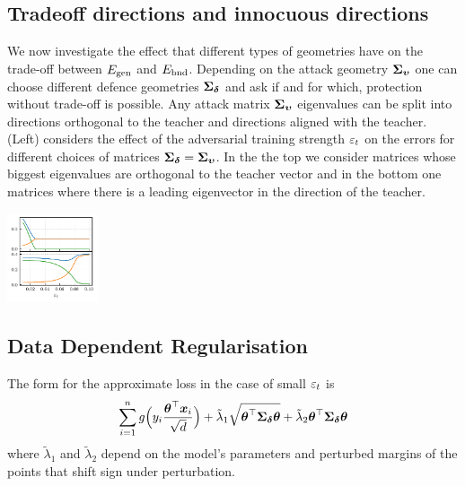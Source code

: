 \documentclass[a0paper,fleqn]{betterportraitposter}
\theoremstyle{plain}
\theoremstyle{definition}
\theoremstyle{remark}
\begin{document}
{\begin{multicols}{3}
\subsection{Tradeoff directions and innocuous directions}
We now investigate the effect that different types of geometries have on the trade-off between \(E_{\mathrm{gen}}\) and \(E_{\mathrm{bnd}}\). 
Depending on the attack geometry \(\boldsymbol{\Sigma}_{\boldsymbol{\upsilon}}\) one can choose different defence geometries \(\boldsymbol{\Sigma}_{\boldsymbol{\delta}}\) and ask if and for which, protection without trade-off is possible. 
Any attack matrix \(\boldsymbol{\Sigma}_{\boldsymbol{\upsilon}}\) eigenvalues can be split into 
directions orthogonal to the teacher and directions aligned with the teacher. 
 (Left) considers the effect of the adversarial training strength \(\varepsilon_t\) on the errors for different choices of matrices \(\boldsymbol{\Sigma}_{\boldsymbol{\delta}} = \boldsymbol{\Sigma}_{\boldsymbol{\upsilon}}\). 
In the the top we consider matrices whose biggest eigenvalues are orthogonal to the teacher vector and in the bottom one matrices where there is a leading eigenvector in the direction of the teacher.

\includegraphics[width=0.2\textwidth]{Assets/optimal_defense.pdf}


\subsection{Data Dependent Regularisation}

The form for the approximate loss in the case of small \(\varepsilon_t\) is
\begin{equation}\label{eq:equivalent-adversarial-regularisation}
    \sum_{i = 1}^{n} 
    g \Big( y_{i} \frac{\boldsymbol{\theta}^\top \boldsymbol{x}_{i}}{\sqrt{d}} \Big) 
    + \tilde{\lambda}_1 \sqrt{\boldsymbol{\theta}^\top \boldsymbol{\Sigma}_{\boldsymbol{\delta}} \boldsymbol{\theta}} + \tilde{\lambda}_2 \boldsymbol{\theta}^\top \boldsymbol{\Sigma}_{\boldsymbol{\delta}} \boldsymbol{\theta}
\end{equation}
where \(\tilde{\lambda}_1\) and \(\tilde{\lambda}_2\) depend on the model's parameters and perturbed margins of the points that shift sign under perturbation. 


\end{multicols}}
\end{document}
